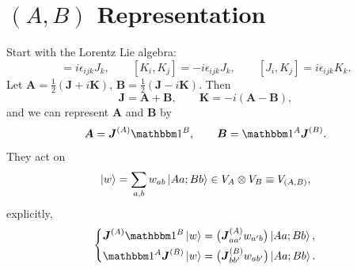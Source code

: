 \section{\texorpdfstring{$(A, B)$}{(A,B)} Representation}
Start with the Lorentz Lie algebra:
\begin{equation}
    [J_i, J_j] = i \epsilon_{i j k} J_k, \qquad [K_i, K_j] = - i \epsilon_{i j k} J_k, \qquad [J_i, K_j] = i \epsilon_{i j k} K_k.
\end{equation}
Let $\boldsymbol{A} = \frac{1}{2} (\boldsymbol{J} + i \boldsymbol{K})$, $\boldsymbol{B} = \frac{1}{2} (\boldsymbol{J} - i \boldsymbol{K})$. Then
\begin{equation}
    \boldsymbol{J} = \boldsymbol{A} + \boldsymbol{B}, \qquad \boldsymbol{K} = - i (\boldsymbol{A} - \boldsymbol{B}),
\end{equation}
and we can represent $\boldsymbol{A}$ and $\boldsymbol{B}$ by
\begin{equation}
    \boldsymbol{A} = \boldsymbol{J}^{(A)} \id^B, \qquad \boldsymbol{B} = \id^A \boldsymbol{J}^{(B)}.
\end{equation}
They act on
\begin{equation}
    \ket{w} = \sum_{a, b} w_{a b} \ket{A a; B b} \in V_A \otimes V_B \equiv V_{(A, B)},
\end{equation}
explicitly,
\begin{equation}
    \begin{dcases}
        \boldsymbol{J}^{(A)} \id^B \ket{w} = \bigl(\boldsymbol{J}^{(A)}_{a a'} w_{a' b} \bigr) \ket{A a; B b}, \\
        \id^A \boldsymbol{J}^{(B)} \ket{w} = \bigl(\boldsymbol{J}^{(B)}_{b b'} w_{a b'} \bigr) \ket{A a; B b}.
    \end{dcases}
\end{equation}
